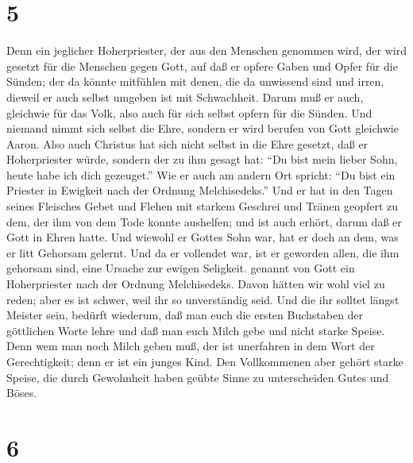 \hypertarget{section-4}{%
\section{5}\label{section-4}}

 Denn ein jeglicher Hoherpriester, der aus den Menschen
genommen wird, der wird gesetzt für die Menschen gegen Gott, auf daß er
opfere Gaben und Opfer für die Sünden;  der da könnte
mitfühlen mit denen, die da unwissend sind und irren, dieweil er auch
selbst umgeben ist mit Schwachheit.  Darum muß er auch,
gleichwie für das Volk, also auch für sich selbst opfern für die Sünden.
 Und niemand nimmt sich selbst die Ehre, sondern er wird
berufen von Gott gleichwie Aaron.  Also auch Christus hat
sich nicht selbst in die Ehre gesetzt, daß er Hoherpriester würde,
sondern der zu ihm gesagt hat: ``Du bist mein lieber Sohn, heute habe
ich dich gezeuget.''  Wie er auch am andern Ort spricht:
``Du bist ein Priester in Ewigkeit nach der Ordnung Melchisedeks.''
 Und er hat in den Tagen seines Fleisches Gebet und Flehen
mit starkem Geschrei und Tränen geopfert zu dem, der ihm von dem Tode
konnte aushelfen; und ist auch erhört, darum daß er Gott in Ehren hatte.
 Und wiewohl er Gottes Sohn war, hat er doch an dem, was er
litt Gehorsam gelernt.  Und da er vollendet war, ist er
geworden allen, die ihm gehorsam sind, eine Ursache zur ewigen
Seligkeit.  genannt von Gott ein Hoherpriester nach der
Ordnung Melchisedeks.  Davon hätten wir wohl viel zu reden;
aber es ist schwer, weil ihr so unverständig seid.  Und die
ihr solltet längst Meister sein, bedürft wiederum, daß man euch die
ersten Buchstaben der göttlichen Worte lehre und daß man euch Milch gebe
und nicht starke Speise.  Denn wem man noch Milch geben
muß, der ist unerfahren in dem Wort der Gerechtigkeit; denn er ist ein
junges Kind.  Den Vollkommenen aber gehört starke Speise,
die durch Gewohnheit haben geübte Sinne zu unterscheiden Gutes und
Böses.

\hypertarget{section-5}{%
\section{6}\label{section-5}}

